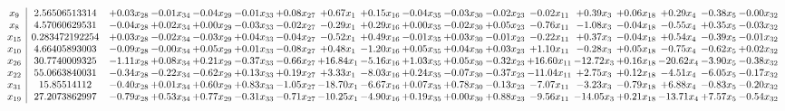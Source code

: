 \documentclass[9pt]{article}
\begin{document}
 \[\begin{array}{c| c c@{\hskip 2pt} c@{\hskip 2pt} c@{\hskip 2pt} c@{\hskip 2pt} c@{\hskip 2pt} c@{\hskip 2pt} c@{\hskip 2pt} c@{\hskip 2pt} c@{\hskip 2pt} c@{\hskip 2pt} c@{\hskip 2pt} c@{\hskip 2pt} c@{\hskip 2pt} c@{\hskip 2pt} c@{\hskip 2pt} c@{\hskip 2pt} }
 x_{9}   &  2.56506513314 & +  0.03 x_{28} & -0.01 x_{34} & -0.04 x_{29} & -0.01 x_{33} & +  0.08 x_{27} & +  0.67 x_{1} & +  0.15 x_{16} & -0.04 x_{35} & -0.03 x_{30} & -0.02 x_{23} & -0.02 x_{11} & +  0.39 x_{3} & +  0.06 x_{18} & +  0.29 x_{4} & -0.38 x_{5} & -0.00 x_{32}\\
 x_{8}   &  4.57060629531 & -0.04 x_{28} & +  0.02 x_{34} & +  0.00 x_{29} & -0.03 x_{33} & -0.02 x_{27} & -0.29 x_{1} & +  0.29 x_{16} & +  0.00 x_{35} & -0.02 x_{30} & +  0.05 x_{23} & -0.76 x_{11} & -1.08 x_{3} & -0.04 x_{18} & -0.55 x_{4} & +  0.35 x_{5} & -0.03 x_{32}\\
 x_{15}   &  0.283472192254 & +  0.03 x_{28} & -0.02 x_{34} & -0.03 x_{29} & +  0.04 x_{33} & -0.04 x_{27} & -0.52 x_{1} & +  0.49 x_{16} & -0.01 x_{35} & +  0.03 x_{30} & -0.01 x_{23} & -0.22 x_{11} & +  0.37 x_{3} & -0.04 x_{18} & +  0.54 x_{4} & -0.39 x_{5} & -0.01 x_{32}\\
 x_{10}   &  4.66405893003 & -0.09 x_{28} & -0.00 x_{34} & +  0.05 x_{29} & +  0.01 x_{33} & -0.08 x_{27} & +  0.48 x_{1} & -1.20 x_{16} & +  0.05 x_{35} & +  0.04 x_{30} & +  0.03 x_{23} & +  1.10 x_{11} & -0.28 x_{3} & +  0.05 x_{18} & -0.75 x_{4} & -0.62 x_{5} & +  0.02 x_{32}\\
 x_{26}   &  30.7740009325 & -1.11 x_{28} & +  0.08 x_{34} & +  0.21 x_{29} & -0.37 x_{33} & -0.66 x_{27} & + 16.84 x_{1} & -5.16 x_{16} & +  1.03 x_{35} & +  0.05 x_{30} & -0.32 x_{23} & + 16.60 x_{11} & -12.72 x_{3} & +  0.16 x_{18} & -20.62 x_{4} & -3.90 x_{5} & -0.38 x_{32}\\
 x_{22}   &  55.0663840031 & -0.34 x_{28} & -0.22 x_{34} & -0.62 x_{29} & +  0.13 x_{33} & +  0.19 x_{27} & +  3.33 x_{1} & -8.03 x_{16} & +  0.24 x_{35} & -0.07 x_{30} & -0.37 x_{23} & -11.04 x_{11} & +  2.75 x_{3} & +  0.12 x_{18} & -4.51 x_{4} & -6.05 x_{5} & -0.17 x_{32}\\
 x_{31}   &  15.85514112 & -0.40 x_{28} & +  0.01 x_{34} & +  0.60 x_{29} & +  0.83 x_{33} & -1.05 x_{27} & -18.70 x_{1} & -6.67 x_{16} & +  0.07 x_{35} & +  0.78 x_{30} & -0.13 x_{23} & -7.07 x_{11} & -3.23 x_{3} & -0.79 x_{18} & +  6.88 x_{4} & -0.83 x_{5} & -0.20 x_{32}\\
 x_{19}   &  27.2073862997 & -0.79 x_{28} & +  0.53 x_{34} & +  0.77 x_{29} & -0.31 x_{33} & -0.71 x_{27} & -10.25 x_{1} & -4.90 x_{16} & +  0.19 x_{35} & +  0.00 x_{30} & +  0.88 x_{23} & -9.56 x_{11} & -14.05 x_{3} & +  0.21 x_{18} & -13.71 x_{4} & +  7.57 x_{5} & -0.54 x_{32}\\

\end{array}\]
\end{document}
